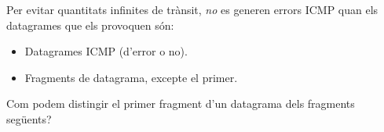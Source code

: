 Per evitar quantitats infinites de trànsit, \textit{no} es generen errors ICMP
quan els datagrames que els provoquen són:
\begin{itemize}
\item Datagrames ICMP (d'error o no).
\item Fragments de datagrama, excepte el primer.
\end{itemize}

\begin{exercise}
Com podem distingir el primer fragment d'un datagrama dels fragments següents?
\end{exercise}

